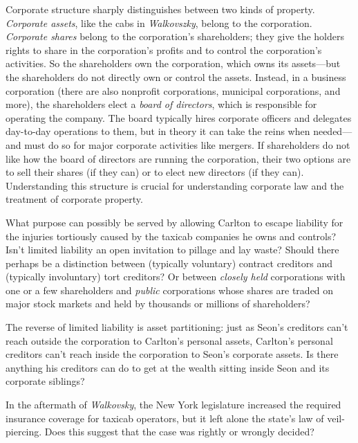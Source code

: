 \item Corporate structure sharply distinguishes between two kinds of property.
\textit{Corporate assets}, like the cabs in \textit{Walkovszky}, belong to the
corporation. \textit{Corporate shares} belong to the corporation's shareholders;
they give the holders rights to share in the corporation's profits and to
control the corporation's activities. So the shareholders own the corporation,
which owns its assets---but the shareholders do not directly own or control the
assets. Instead, in a business corporation (there are also nonprofit
corporations, municipal corporations, and more), the shareholders elect a
\textit{board of directors}, which is responsible for operating the company. The
board typically hires corporate officers and delegates day-to-day operations to
them, but in theory it can take the reins when needed---and must do so for major
corporate activities like mergers. If shareholders do not like how the board of
directors are running the corporation, their two options are to sell their
shares (if they can) or to elect new directors (if they can). Understanding this
structure is crucial for understanding corporate law and the treatment of
corporate property.

\item What purpose can possibly be served by allowing Carlton to escape
liability for the injuries tortiously caused by the taxicab companies he owns
and controls? Isn't limited liability an open invitation to pillage and lay
waste? Should there perhaps be a distinction between (typically voluntary)
contract creditors and (typically involuntary) tort creditors? Or between
\textit{closely held} corporations with one or a few shareholders and
\textit{public} corporations whose shares are traded on major stock markets and
held by thousands or millions of shareholders?

\item The reverse of limited liability is asset partitioning: just as Seon's
creditors can't reach outside the corporation to Carlton's personal assets,
Carlton's personal creditors can't reach inside the corporation to Seon's
corporate assets. Is there anything his creditors can do to get at the wealth
sitting inside Seon and its corporate siblings?

\item In the aftermath of \textit{Walkovsky}, the New York legislature increased
the required insurance coverage for taxicab operators, but it left alone the
state's law of veil-piercing. Does this suggest that the case was rightly or
wrongly decided?

